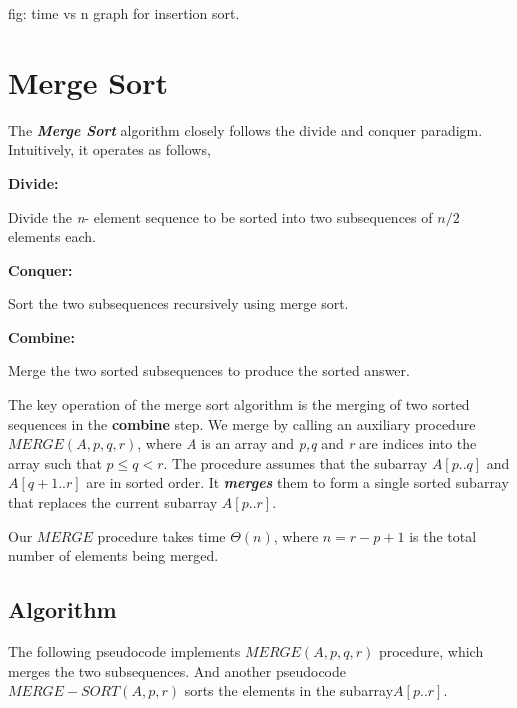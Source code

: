\documentclass[12 pt,a4paper]{report}
\begin{document}
\hspace{4cm}fig: time vs n graph for insertion sort.

\newpage

\section{Merge Sort}

The \textbf{\textit{Merge Sort}} algorithm closely follows the divide and conquer paradigm. Intuitively, it operates as follows,
\vspace{0.5cm}

\textbf{Divide:}

Divide the \textit{n}- element sequence to be sorted into two subsequences of $n/2$ elements  each.
\vspace{0.5cm}

\textbf{Conquer:}

Sort the two subsequences recursively using merge sort.
\vspace{0.5cm}

\textbf{Combine:}

Merge the two sorted subsequences to produce the sorted answer.
\vspace{0.5cm}

The key operation of the merge sort algorithm is the merging of two sorted sequences in the \textbf{combine} step. We merge by calling an auxiliary procedure $MERGE(A,p,q,r)$, where \textit{A} is an array and \textit{p,q} and \textit{r} are indices into the array such that $p\leq q<r$. The procedure assumes that the subarray $A[p..q]$ and $A[q+1..r]$ are in sorted order. It \textbf{\textit{merges}} them to form a single sorted subarray that replaces the current subarray $A[p..r]$.
\vspace{0.5cm}

Our $MERGE$ procedure takes time $\Theta(n)$, where $n=r-p+1$ is the total number of elements being merged.

\newpage


\subsection{Algorithm}

The following pseudocode implements $MERGE(A,p,q,r)$ procedure, which merges the two subsequences. And another pseudocode $MERGE-SORT(A,p,r)$ sorts the elements in the subarray$A[p..r]$.
\vspace{1cm}
\end{document}
